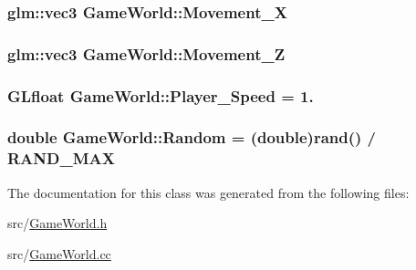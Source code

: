 \subsubsection[{Movement\+\_\+\+X}]{\setlength{\rightskip}{0pt plus 5cm}glm\+::vec3 Game\+World\+::\+Movement\+\_\+\+X}\label{classGameWorld_a968eb29424b68f7cd79a5896c62e944d}
\hypertarget{classGameWorld_a8dd30ba92e7fa9b9b05075e31d1e7dd8}{}
\subsubsection[{Movement\+\_\+\+Z}]{\setlength{\rightskip}{0pt plus 5cm}glm\+::vec3 Game\+World\+::\+Movement\+\_\+\+Z}\label{classGameWorld_a8dd30ba92e7fa9b9b05075e31d1e7dd8}
\hypertarget{classGameWorld_ae8ab2ac372729cec44ea316f6bdf45ca}{}
\subsubsection[{Player\+\_\+\+Speed}]{\setlength{\rightskip}{0pt plus 5cm}G\+Lfloat Game\+World\+::\+Player\+\_\+\+Speed = 1.}\label{classGameWorld_ae8ab2ac372729cec44ea316f6bdf45ca}
\hypertarget{classGameWorld_a56652cc9880b3ba1be61395066c863c3}{}
\subsubsection[{Random}]{\setlength{\rightskip}{0pt plus 5cm}double Game\+World\+::\+Random = (double)rand() / R\+A\+N\+D\+\_\+\+M\+A\+X}\label{classGameWorld_a56652cc9880b3ba1be61395066c863c3}


The documentation for this class was generated from the following files\+:\begin{DoxyCompactItemize}
\item 
src/\hyperlink{GameWorld_8h}{Game\+World.\+h}\item 
src/\hyperlink{GameWorld_8cc}{Game\+World.\+cc}\end{DoxyCompactItemize}
